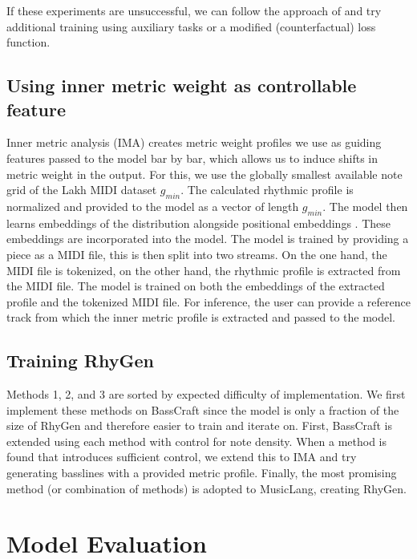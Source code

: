 If these experiments are unsuccessful, we can follow the approach of \cite{Shu_Xu_Musebarcontrol_2024} and try additional training using auxiliary tasks or a modified (counterfactual) loss function. 

\subsection{Using inner metric weight as controllable feature}
Inner metric analysis (IMA) creates metric weight profiles we use as guiding features passed to the model bar by bar, which allows us to induce shifts in metric weight in the output. 
For this, we use the globally smallest available note grid of the Lakh MIDI dataset $g_{min}$. The calculated rhythmic profile is normalized and provided to the model as a vector of length $g_{min}$. 
The model then learns embeddings of the distribution alongside positional embeddings \cite{Lin_cocomulla_2024}. These embeddings are incorporated into the model. 
The model is trained by providing a piece as a MIDI file, this is then split into two streams. On the one hand, the MIDI file is tokenized, on the other hand, the rhythmic profile is extracted from the MIDI file. The model is trained on both the embeddings of the extracted profile and the tokenized MIDI file. 
For inference, the user can provide a reference track from which the inner metric profile is extracted and passed to the model. 

\subsection{Training RhyGen}
Methods 1, 2, and 3 are sorted by expected difficulty of implementation. We first implement these methods on BassCraft since the model is only a fraction of the size of RhyGen and therefore easier to train and iterate on. First, BassCraft is extended using each method with control for note density. When a method is found that introduces sufficient control, we extend this to IMA and try generating basslines with a provided metric profile. Finally, the most promising method (or combination of methods) is adopted to MusicLang, creating RhyGen.


\section{Model Evaluation}
